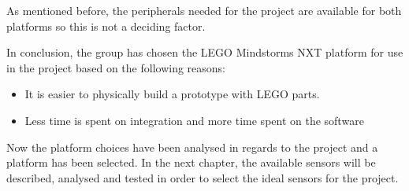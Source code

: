As mentioned before, the peripherals needed for the project are available for
both platforms so this is not a deciding factor.\nl

In conclusion, the group has chosen the LEGO Mindstorms NXT platform for use in
the project based on the following reasons:

\begin{itemize}
  \item It is easier to physically build a prototype with LEGO parts.
  \item Less time is spent on integration and more time spent on the software
\end{itemize}

Now the platform choices have been analysed in regards to the project and a
platform has been selected. In the next chapter, the available sensors will be
described, analysed and tested in order to select the ideal sensors for the
project.
